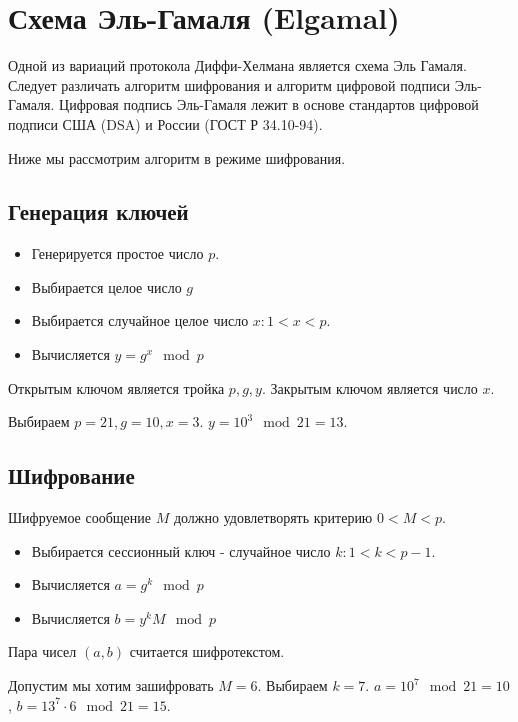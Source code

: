 \section{Схема Эль-Гамаля (Elgamal)}
Одной из вариаций протокола Диффи-Хелмана является схема Эль
Гамаля. Следует различать алгоритм шифрования и алгоритм цифровой
подписи Эль-Гамаля. Цифровая подпись Эль-Гамаля лежит в основе
стандартов цифровой подписи США (DSA) и России (ГОСТ Р 34.10-94).

Ниже мы рассмотрим алгоритм в режиме шифрования.

\subsection{Генерация ключей}

\begin{itemize}
\item Генерируется простое число $p$.
\item Выбирается целое число $g$
\item Выбирается случайное целое число $x: 1 < x < p$.
\item Вычисляется $y = g^x \mod p$
\end{itemize}

Открытым ключом  является тройка $p, g, y$. Закрытым ключом является
число $x$.

\begin{example}
Выбираем $p = 21, g = 10, x = 3$. $y = 10^3 \mod 21 = 13$.
\label{ex:add:dm:elgamal_gen}
\end{example}

\subsection{Шифрование}
Шифруемое сообщение $M$ должно удовлетворять критерию $0 < M < p$.
\begin{itemize}
\item Выбирается сессионный ключ - случайное число $k: 1 < k < p - 1$.
\item Вычисляется $a = g^k \mod p$
\item Вычисляется $b = y^k M \mod p$
\end{itemize}

Пара чисел $(a, b)$ считается шифротекстом.
\begin{example}
Допустим мы хотим зашифровать $M=6$.
Выбираем $k = 7$. $a = 10^7 \mod 21 = 10$, $b = 13^7 \cdot 6 \mod 21 =
15$.
\label{ex:add:dm:elgamal_crypt}
\end{example}

